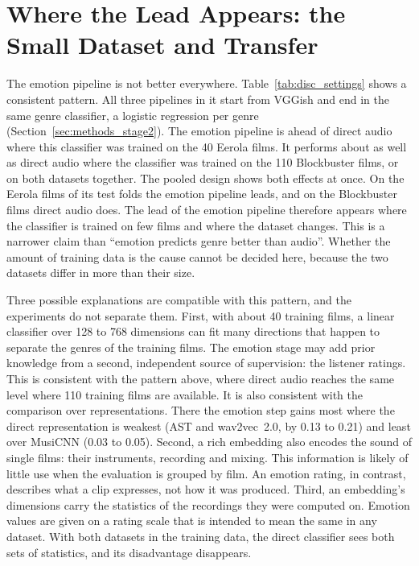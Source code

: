 \section{Where the Lead Appears: the Small Dataset and Transfer}
\label{sec:disc_main}

The emotion pipeline is not better everywhere. Table~\ref{tab:disc_settings} shows a consistent
pattern. All three pipelines in it start from VGGish and end in the same genre classifier, a
logistic regression per genre (Section~\ref{sec:methods_stage2}). The emotion pipeline is ahead of direct audio where this classifier was trained on the 40 Eerola films. It performs about as well as direct audio where the classifier was trained on the 110 Blockbuster films, or
on both datasets together. The pooled design shows both effects at once. On the Eerola films
of its test folds the emotion pipeline leads, and on the Blockbuster films direct audio
does. The lead of the emotion pipeline therefore appears where the classifier is trained on few films and where the dataset changes. This is a narrower claim than ``emotion predicts genre better than audio''. Whether the amount of training data is the cause cannot be decided here, because the two datasets differ in more than their size.

Three possible explanations are compatible with this pattern, and the experiments do not
separate them. First, with about 40 training films, a linear
classifier over 128 to 768 dimensions can fit many directions that happen to separate the
genres of the training films. The emotion stage may add prior knowledge from a second,
independent source of supervision: the listener ratings. This is consistent with the pattern above, where
direct audio reaches the same level where 110 training films are available. It is also consistent with the
comparison over representations. There the emotion step gains most where the direct
representation is weakest (AST and wav2vec~2.0, by 0.13 to 0.21) and least over MusiCNN
(0.03 to 0.05). Second, a rich embedding also encodes the sound of single films: their
instruments, recording and mixing. This information is likely of little use when the evaluation is grouped by film.
An emotion rating, in contrast, describes what a clip expresses, not how it was produced.
Third, an embedding's dimensions carry the statistics of the recordings they were computed
on. Emotion values are given on a rating scale that is intended to mean the same in any dataset. With
both datasets in the training data, the direct classifier sees both sets of statistics, and
its disadvantage disappears.

